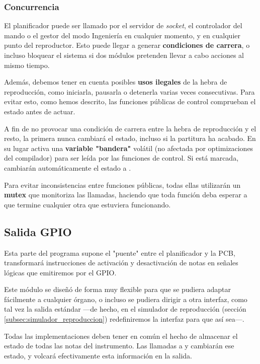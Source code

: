 \subsubsection{Concurrencia}

El planificador puede ser llamado por el servidor de \textit{socket}, el controlador del mando o el gestor del modo Ingeniería en cualquier momento, y en cualquier punto del reproductor. Esto puede llegar a generar \textbf{condiciones de carrera}, o incluso bloquear el sistema si dos módulos pretenden llevar a cabo acciones al mismo tiempo.

Además, debemos tener en cuenta posibles \textbf{usos ilegales} de la hebra de reproducción, como iniciarla, pausarla o detenerla varias veces consecutivas. Para evitar esto, como hemos descrito, las funciones públicas de control comprueban el estado antes de actuar.

A fin de no provocar una condición de carrera entre la hebra de reproducción y el resto, la primera nunca cambiará el estado, incluso si la partitura ha acabado. En su lugar activa una \textbf{variable "bandera"} volátil (no afectada por optimizaciones del compilador) para ser leída por las funciones de control. Si está marcada, cambiarán automáticamente el estado a .

Para evitar inconsistencias entre funciones públicas, todas ellas utilizarán un \textbf{\acrshort{mutex}} que monitoriza las llamadas, haciendo que toda función deba esperar a que termine cualquier otra que estuviera funcionando.

\subsection{Salida GPIO}

Esta parte del programa supone el "puente" entre el planificador y la \acrshort{PCB}, transformará instrucciones de activación y desactivación de notas en señales lógicas que emitiremos por el \acrshort{GPIO}. 

Este módulo se diseñó de forma muy flexible para que se pudiera adaptar fácilmente a cualquier órgano, o incluso se pudiera dirigir a otra interfaz, como tal vez la salida estándar ---de hecho, en el simulador de reproducción (sección \ref{subsec:simulador_reproduccion}) redefiniremos la interfaz para que así sea---.

Todas las implementaciones deben tener en común el hecho de almacenar el estado de todas las notas del instrumento. Las llamadas a  y  cambiarán ese estado, y  volcará efectivamente esta información en la salida.

